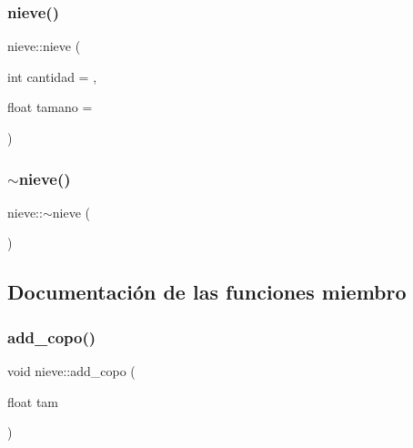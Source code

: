 \subsubsection{\texorpdfstring{nieve()}{nieve()}}
{\footnotesize\ttfamily nieve\+::nieve (\begin{DoxyParamCaption}\item[{int}]{cantidad = {},  }\item[{float}]{tamano = {} }\end{DoxyParamCaption})\hspace{0.3cm}{\ttfamily [inline]}}

\mbox{\label{classnieve_a554baea3727dc5650c5e8cec2f765e24}} 
\subsubsection{\texorpdfstring{$\sim$nieve()}{~nieve()}}
{\footnotesize\ttfamily nieve\+::$\sim$nieve (\begin{DoxyParamCaption}{ }\end{DoxyParamCaption})\hspace{0.3cm}{\ttfamily [inline]}}



\subsection{Documentación de las funciones miembro}
\mbox{\label{classnieve_ab9448be3dcc8882de5153a4a2ee04aa1}} 
\subsubsection{\texorpdfstring{add\_copo()}{add\_copo()}}
{\footnotesize\ttfamily void nieve\+::add\+\_\+copo (\begin{DoxyParamCaption}\item[{float}]{tam }\end{DoxyParamCaption})\hspace{0.3cm}{\ttfamily [inline]}}

\mbox{\label{classnieve_a11c4d67704bad84f82f3f574d98958ef}} 
